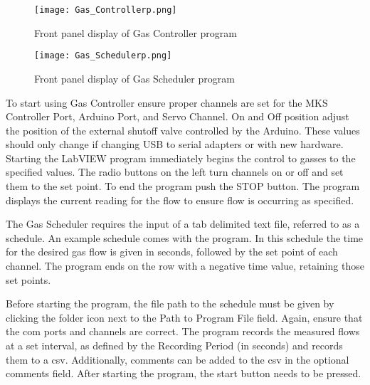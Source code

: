         \begin{figure}
            \begin{center}
            \texttt{[image: Gas\_Controllerp.png]}
            \end{center}
            \caption{Front panel display of Gas Controller program}
            \label{fig:gascontrolfront}
        \end{figure}

        \begin{figure}
            \begin{center}
            \texttt{[image: Gas\_Schedulerp.png]}
            \end{center}
            \caption{Front panel display of Gas Scheduler program}
            \label{fig:gasschedfront}
        \end{figure}

        To start using Gas Controller ensure proper channels are set for the MKS Controller Port, Arduino Port, and Servo Channel.
        On and Off position adjust the position of the external shutoff valve controlled by the Arduino.
        These values should only change if changing USB to serial adapters or with new hardware.
        Starting the LabVIEW program immediately begins the control to gasses to the specified values.
        The radio buttons on the left turn channels on or off and set them to the set point.
        To end the program push the STOP button.
        The program displays the current reading for the flow to ensure flow is occurring as specified.

        The Gas Scheduler requires the input of a tab delimited text file, referred to as a schedule.
        An example schedule comes with the program.
        In this schedule the time for the desired gas flow is given in seconds, followed by the set point of each channel.
        The program ends on the row with a negative time value, retaining those set points.

        Before starting the program, the file path to the schedule must be given by clicking the folder icon next to the Path to Program File field.
        Again, ensure that the com ports and channels are correct.
        The program records the measured flows at a set interval, as defined by the Recording Period (in seconds) and records them to a \gls{csv}.
        Additionally, comments can be added to the \gls{csv} in the optional comments field.
        After starting the program, the start button needs to be pressed.

